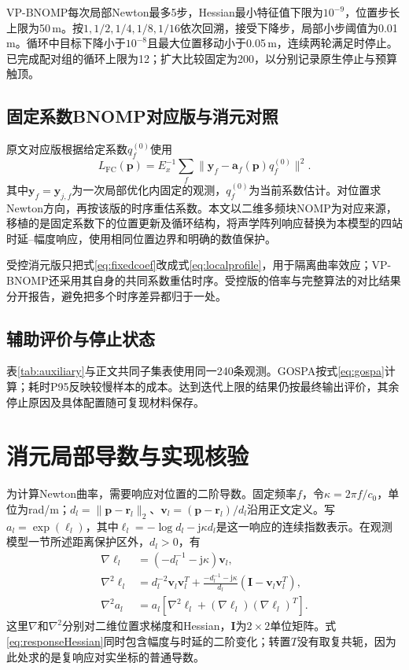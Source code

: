 VP-BNOMP每次局部Newton最多5步，Hessian最小特征值下限为$10^{-9}$，位置步长上限为50\,m。按$1,1/2,1/4,1/8,1/16$依次回溯，接受下降步，局部小步阈值为0.01\,m。循环中目标下降小于$10^{-8}$且最大位置移动小于0.05\,m，连续两轮满足时停止。已完成配对组的循环上限为12；扩大比较固定为200，以分别记录原生停止与预算触顶。

\subsection{固定系数BNOMP对应版与消元对照}
原文对应版根据给定系数$q_f^{(0)}$使用
\begin{equation}
 L_{\mathrm{FC}}(\bm p)=E_x^{-1}\sum_f
 \|\bm y_f-\bm a_f(\bm p)q_f^{(0)}\|^2 .\label{eq:fixedcoef}
\end{equation}
其中$\bm y_f=\bm y_{j,f}$为一次局部优化内固定的观测，$q_f^{(0)}$为当前系数估计。对位置求Newton方向，再按该版的时序重估系数。本文以二维多频块NOMP\cite{Yang2022}为对应来源，移植的是固定系数下的位置更新及循环结构，将声学阵列响应替换为本模型的四站时延--幅度响应，使用相同位置边界和明确的数值保护。

受控消元版只把式\eqref{eq:fixedcoef}改成式\eqref{eq:localprofile}，用于隔离曲率效应；VP-BNOMP还采用其自身的共同系数重估时序。受控版的倍率与完整算法的对比结果分开报告，避免把多个时序差异都归于一处。

\subsection{辅助评价与停止状态}
表\ref{tab:auxiliary}与正文共同子集表使用同一240条观测。GOSPA按式\eqref{eq:gospa}计算；耗时P95反映较慢样本的成本。达到迭代上限的结果仍按最终输出评价，其余停止原因及具体配置随可复现材料保存。


\section{消元局部导数与实现核验}\label{app:derivatives}
为计算Newton曲率，需要响应对位置的二阶导数。固定频率$f$，令$\kappa=2\pi f/c_0$，单位为rad/m；$d_l=\|\bm p-\bm r_l\|_2$、$\bm v_l=(\bm p-\bm r_l)/d_l$沿用正文定义。写$a_l=\exp(\ell_l)$，其中$\ell_l=-\log d_l-\mathrm j\kappa d_l$是这一响应的连续指数表示。在观测模型一节所述距离保护区外，$d_l>0$，有
\begin{align}
 \nabla\ell_l&=(-d_l^{-1}-\mathrm j\kappa)\bm v_l,\\
 \nabla^2\ell_l&=d_l^{-2}\bm v_l\bm v_l^T
 +\frac{-d_l^{-1}-\mathrm j\kappa}{d_l}
 (\bm I-\bm v_l\bm v_l^T),\\
 \nabla^2 a_l&=a_l[\nabla^2\ell_l+(\nabla\ell_l)(\nabla\ell_l)^T].\label{eq:responseHessian}
\end{align}
这里$\nabla$和$\nabla^2$分别对二维位置求梯度和Hessian，$\bm I$为$2\times2$单位矩阵。式\eqref{eq:responseHessian}同时包含幅度与时延的二阶变化；转置$T$没有取复共轭，因为此处求的是复响应对实坐标的普通导数。

